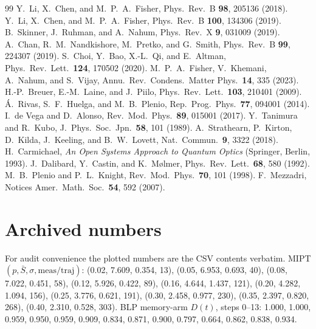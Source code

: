 \documentclass[aps,pra,preprint,superscriptaddress]{revtex4-2}
\begin{document}
\begin{thebibliography}{99}
 Y.~Li, X.~Chen, and M.~P.~A.~Fisher,
Phys.\ Rev.\ B \textbf{98}, 205136 (2018).
 Y.~Li, X.~Chen, and M.~P.~A.~Fisher,
Phys.\ Rev.\ B \textbf{100}, 134306 (2019).
 B.~Skinner, J.~Ruhman, and A.~Nahum,
Phys.\ Rev.\ X \textbf{9}, 031009 (2019).
 A.~Chan, R.~M.~Nandkishore, M.~Pretko, and
G.~Smith, Phys.\ Rev.\ B \textbf{99}, 224307 (2019).
 S.~Choi, Y.~Bao, X.-L.~Qi, and E.~Altman,
Phys.\ Rev.\ Lett.\ \textbf{124}, 170502 (2020).
 M.~P.~A.~Fisher, V.~Khemani, A.~Nahum, and
S.~Vijay, Annu.\ Rev.\ Condens.\ Matter Phys.\ \textbf{14}, 335 (2023).
 H.-P.~Breuer, E.-M.~Laine, and J.~Piilo,
Phys.\ Rev.\ Lett.\ \textbf{103}, 210401 (2009).
 \'{A}.~Rivas, S.~F.~Huelga, and
M.~B.~Plenio, Rep.\ Prog.\ Phys.\ \textbf{77}, 094001 (2014).
 I.~de Vega and D.~Alonso,
Rev.\ Mod.\ Phys.\ \textbf{89}, 015001 (2017).
 Y.~Tanimura and R.~Kubo,
J.\ Phys.\ Soc.\ Jpn.\ \textbf{58}, 101 (1989).
 A.~Strathearn, P.~Kirton, D.~Kilda, J.~Keeling, and
B.~W.~Lovett, Nat.\ Commun.\ \textbf{9}, 3322 (2018).
 H.~Carmichael, \textit{An Open Systems Approach to
Quantum Optics} (Springer, Berlin, 1993).
 J.~Dalibard, Y.~Castin, and K.~M\o lmer,
Phys.\ Rev.\ Lett.\ \textbf{68}, 580 (1992).
 M.~B.~Plenio and P.~L.~Knight,
Rev.\ Mod.\ Phys.\ \textbf{70}, 101 (1998).
 F.~Mezzadri, Notices Amer.\ Math.\ Soc.\
\textbf{54}, 592 (2007).
\end{thebibliography}

\appendix
\section{Archived numbers}

For audit convenience the plotted numbers are the CSV contents verbatim.
MIPT $(p, \bar S, \sigma, \mathrm{meas/traj})$:
(0.02, 7.609, 0.354, 13), (0.05, 6.953, 0.693, 40),
(0.08, 7.022, 0.451, 58), (0.12, 5.926, 0.422, 89),
(0.16, 4.644, 1.437, 121), (0.20, 4.282, 1.094, 156),
(0.25, 3.776, 0.621, 191), (0.30, 2.458, 0.977, 230),
(0.35, 2.397, 0.820, 268), (0.40, 2.310, 0.528, 303).
BLP memory-arm $D(t)$, steps 0--13:
1.000, 1.000, 0.959, 0.950, 0.959, 0.909, 0.834, 0.871, 0.900, 0.797,
0.664, 0.862, 0.838, 0.934.
\end{document}
